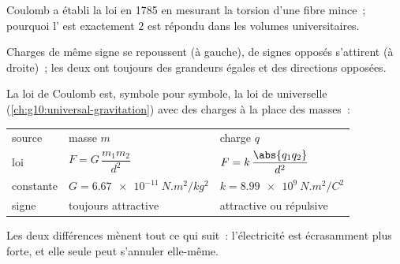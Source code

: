 \begin{remark}\label{rem:g11:fundamental-interactions:torsion}
Coulomb a établi la loi en 1785 en mesurant la torsion d'une fibre
mince~; pourquoi l'
est exactement $2$ est répondu dans les volumes universitaires.
\end{remark}

\begin{omfigure}
\qquad
{}

{\small Charges de même signe se repoussent (à gauche), de signes
opposés s'attirent (à droite)~; les deux
 ont toujours des grandeurs égales et des
directions opposées.}
\end{omfigure}

\begin{remark}\label{rem:g11:fundamental-interactions:twin}
La loi de Coulomb est, symbole pour symbole, la loi de
 universelle
(\cref{ch:g10:universal-gravitation}) avec des charges à la place des
masses~:
\begin{center}
\begin{tabular}{lll}
source & masse $m$ & charge $q$ \\
loi & $F = G\,\dfrac{m_1 m_2}{d^2}$ & $F = k\,\dfrac{\abs{q_1 q_2}}{d^2}$ \\[1.5ex]
constante & $G = \qty{6.67e-11}{N.m^2/kg^2}$ & $k = \qty{8.99e9}{N.m^2/C^2}$ \\
signe & toujours attractive & attractive ou répulsive \\
\end{tabular}
\end{center}
Les deux différences mènent tout ce qui suit~: l'électricité est
écrasamment plus forte, et elle seule peut s'annuler elle-même.
\end{remark}

